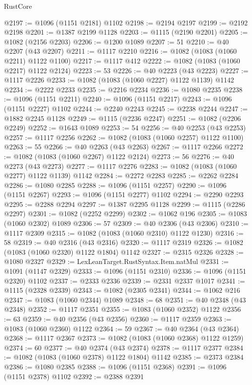 \begin{lexlean}{RustCore}
\begin{coremodule}
@2197 := @1096 (@1151 @2181) @1102
@2198 := @2194 @2197
@2199 := @2192 @2198
@2201 := @1387 @2199 @1128
@2203 := @1115 (@2190 @2201)
@2205 := @1082 (@2156 @2203)
@2206 := @1200 @1089
@2207 := 51
@2210 := @40 @2207 (@43 @2207)
@2211 := @1117 @2210
@2216 := @1082 (@1083 (@1060 @2211) @1122 @1100)
@2217 := @1117 @412
@2222 := @1082 (@1083 (@1060 @2217) @1122 @2124)
@2223 := 53
@2226 := @40 @2223 (@43 @2223)
@2227 := @1117 @2226
@2233 := @1082 (@1083 (@1060 @2227) @1122 @1139) @1142
@2234 := @2222 @2233
@2235 := @2216 @2234
@2236 := @1080 @2235
@2238 := @1096 (@1151 @2211)
@2240 := @1096 (@1151 @2217)
@2243 := @1096 (@1151 @2227) @1102
@2244 := @2240 @2243
@2245 := @2238 @2244
@2247 := @1882 @2245 @1128
@2249 := @1115 (@2236 @2247)
@2251 := @1082 (@2206 @2249)
@2252 := @1643 @1089
@2253 := 54
@2256 := @40 @2253 (@43 @2253)
@2257 := @1117 @2256
@2262 := @1082 (@1083 (@1060 @2257) @1122 @1100)
@2263 := 55
@2266 := @40 @2263 (@43 @2263)
@2267 := @1117 @2266
@2272 := @1082 (@1083 (@1060 @2267) @1122 @2124)
@2273 := 56
@2276 := @40 @2273 (@43 @2273)
@2277 := @1117 @2276
@2283 := @1082 (@1083 (@1060 @2277) @1122 @1139) @1142
@2284 := @2272 @2283
@2285 := @2262 @2284
@2286 := @1080 @2285
@2288 := @1096 (@1151 @2257)
@2290 := @1096 (@1151 @2267)
@2293 := @1096 (@1151 @2277) @1102
@2294 := @2290 @2293
@2295 := @2288 @2294
@2297 := @1387 @2295 @1128
@2299 := @1115 (@2286 @2297)
@2301 := @1082 (@2252 @2299)
@2302 := @1062 @196
@2305 := @1083 (@1060 @2302) @1089
@2306 := 57
@2309 := @40 @2306 (@43 @2306)
@2310 := @1117 @2309
@2315 := @1082 (@1083 (@1060 @2310) @1122 @1230)
@2316 := 58
@2319 := @40 @2316 (@43 @2316)
@2320 := @1117 @2319
@2326 := @1082 (@1083 (@1060 @2320) @1122 @1804) @1142
@2327 := @2315 @2326
@2328 := @1080 @2327
@2329 := LexLeanTarget.RustSyntax.Item.natMul
@2331 := @1091 (@1147 @2329)
@2333 := @1096 (@1151 @2310)
@2336 := @1096 (@1151 @2320) @1102
@2337 := @2333 @2336
@2339 := @2331 @2337 @1017
@2341 := @1115 (@2328 @2339)
@2343 := @1082 (@2305 @2341)
@2344 := @1062 @216
@2347 := @1083 (@1060 @2344) @1089
@2348 := 68
@2351 := @40 @2348 (@43 @2348)
@2352 := @1117 @2351
@2355 := @1083 (@1060 @2352) @1122
@2356 := 63
@2359 := @40 @2356 (@43 @2356)
@2360 := @1117 @2359
@2363 := @1083 (@1060 @2360) @1122
@2364 := 59
@2367 := @40 @2364 (@43 @2364)
@2368 := @1117 @2367
@2373 := @1082 (@1083 (@1060 @2368) @1122 @1259)
@2374 := 60
@2377 := @40 @2374 (@43 @2374)
@2378 := @1117 @2377
@2384 := @1082 (@1083 (@1060 @2378) @1122 @1804) @1142
@2385 := @2373 @2384
@2386 := @1080 @2385
@2388 := @1096 (@1151 @2368)
@2391 := @1096 (@1151 @2378) @1102
@2392 := @2388 @2391

\end{coremodule}
\end{lexlean}

